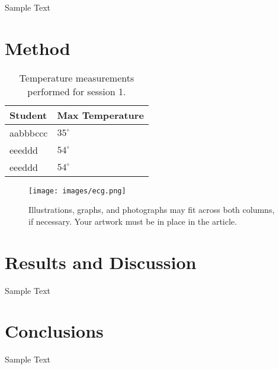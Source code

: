 \documentclass[journal]{IEEEtran}
\begin{document}
Sample Text

\section{Method}

\begin{table}[!ht] %
\centering
\label{table:Exps}
\begin{tabular}{ll}
Student &  Max Temperature \\ \hline
aabbbccc &  $35^{\circ}$   \\
eeeddd &   $54^{\circ}$ \\
eeeddd &   $54^{\circ}$ \\
\end{tabular}
\caption{Temperature measurements performed for session 1.}
\end{table}


\begin{figure}[H]%
\begin {center}
\texttt{[image: images/ecg.png]}
\caption{Illustrations, graphs, and photographs may fit across both columns, if necessary. Your artwork must be in place in the article.}
\label{fig:ecg}
\end {center}
\end{figure}


\section{Results and Discussion}

Sample Text


\section{Conclusions}

Sample Text


%
\end{document}
